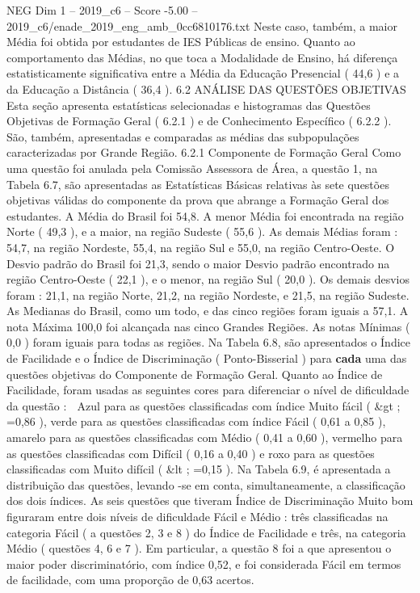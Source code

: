 \begin{textsample}{NEG Dim 1 – 2019\_c6 – Score -5.00 – 2019\_c6/enade\_2019\_eng\_amb\_0cc6810176.txt}
Neste caso, também, a maior Média foi obtida por estudantes de IES Públicas de ensino.
Quanto ao comportamento das Médias, no que toca a Modalidade de Ensino, há diferença estatisticamente significativa entre a Média da Educação Presencial ( 44,6 ) e a da Educação a Distância ( 36,4 ). 6.2 ANÁLISE DAS QUESTÕES OBJETIVAS Esta seção apresenta estatísticas selecionadas e histogramas das Questões Objetivas de Formação Geral ( 6.2.1 ) e de Conhecimento Específico ( 6.2.2 ).
São, também, apresentadas e comparadas as médias das subpopulações caracterizadas por Grande Região. 6.2.1 Componente de Formação Geral Como uma questão foi anulada pela Comissão Assessora de Área, a questão 1, na Tabela 6.7, são apresentadas as Estatísticas Básicas relativas às sete questões objetivas válidas do componente da prova que abrange a Formação Geral dos estudantes.
A Média do Brasil foi 54,8.
A menor Média foi encontrada na região Norte ( 49,3 ), e a maior, na região Sudeste ( 55,6 ).
As demais Médias foram : 54,7, na região Nordeste, 55,4, na região Sul e 55,0, na região Centro-Oeste.
O Desvio padrão do Brasil foi 21,3, sendo o maior Desvio padrão encontrado na região Centro-Oeste ( 22,1 ), e o menor, na região Sul ( 20,0 ).
Os demais desvios foram : 21,1, na região Norte, 21,2, na região Nordeste, e 21,5, na região Sudeste.
As Medianas do Brasil, como um todo, e das cinco regiões foram iguais a 57,1.
A nota Máxima 100,0 foi alcançada nas cinco Grandes Regiões.
As notas Mínimas ( 0,0 ) foram iguais para todas as regiões.
Na Tabela 6.8, são apresentados o Índice de Facilidade e o Índice de Discriminação ( Ponto-Bisserial ) para \textbf{cada} uma das questões objetivas do Componente de Formação Geral.
Quanto ao Índice de Facilidade, foram usadas as seguintes cores para diferenciar o nível de dificuldade da questão :  Azul para as questões classificadas com índice Muito fácil ( \&gt ; =0,86 ), verde para as questões classificadas com índice Fácil ( 0,61 a 0,85 ), amarelo para as questões classificadas com Médio ( 0,41 a 0,60 ), vermelho para as questões classificadas com Difícil ( 0,16 a 0,40 ) e roxo para as questões classificadas com Muito difícil ( \&lt ; =0,15 ).
Na Tabela 6.9, é apresentada a distribuição das questões, levando -se em conta, simultaneamente, a classificação dos dois índices.
As seis questões que tiveram Índice de Discriminação Muito bom figuraram entre dois níveis de dificuldade Fácil e Médio : três classificadas na categoria Fácil ( a questões 2, 3 e 8 ) do Índice de Facilidade e três, na categoria Médio ( questões 4, 6 e 7 ).
Em particular, a questão 8 foi a que apresentou o maior poder discriminatório, com índice 0,52, e foi considerada Fácil em termos de facilidade, com uma proporção de 0,63 acertos.

\end{textsample}
